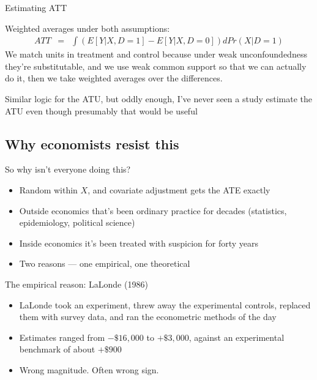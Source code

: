 \documentclass{beamer}
\begin{document}
\begin{frame}{Estimating ATT}


Weighted averages under both assumptions:
		\begin{eqnarray*}
		{ATT} &=& \int \left(E[Y|X,D=1] - E[Y|X,D=0]\right)dPr(X|D=1)
		\end{eqnarray*}
We match units in treatment and control because under weak unconfoundedness they're substitutable, and we use weak common support so that we can actually do it, then we take weighted averages over the differences.  

\bigskip

Similar logic for the ATU, but oddly enough, I've never seen a study estimate the ATU even though presumably that would be useful
		
\end{frame}







\subsection{Why economists resist this}

\begin{frame}{So why isn't everyone doing this?}

\begin{itemize}
\item Random within $X$, and covariate adjustment gets the ATE exactly
\item Outside economics that's been ordinary practice for decades (statistics, epidemiology, political science)
\item Inside economics it's been treated with suspicion for forty years
\item Two reasons --- one empirical, one theoretical
\end{itemize}

\end{frame}


\begin{frame}{The empirical reason: LaLonde (1986)}

\begin{itemize}
\item LaLonde took an experiment, threw away the experimental controls, replaced them with survey data, and ran the econometric methods of the day
\item Estimates ranged from $-\$16{,}000$ to $+\$3{,}000$, against an experimental benchmark of about $+\$900$
\item Wrong magnitude. Often wrong sign.
\end{itemize}

\end{frame}
\end{document}

